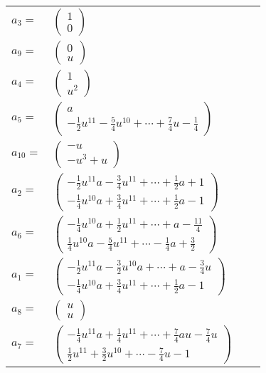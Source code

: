 \documentclass[1p]{elsarticle_modified}
\theoremstyle{definition}
\begin{document}
\begin{tabular}{m{7pt} m{180pt} m{7pt} m{180pt} }
\flushright $a_{3}=$&$\begin{pmatrix}1\\0\end{pmatrix}$ \\
\flushright $a_{9}=$&$\begin{pmatrix}0\\u\end{pmatrix}$ \\
\flushright $a_{4}=$&$\begin{pmatrix}1\\u^2\end{pmatrix}$ \\
\flushright $a_{5}=$&$\begin{pmatrix}a\\-\frac{1}{2} u^{11}-\frac{5}{4} u^{10}+\cdots+\frac{7}{4} u-\frac{1}{4}\end{pmatrix}$ \\
\flushright $a_{10}=$&$\begin{pmatrix}- u\\- u^3+u\end{pmatrix}$ \\
\flushright $a_{2}=$&$\begin{pmatrix}-\frac{1}{2} u^{11} a-\frac{3}{4} u^{11}+\cdots+\frac{1}{2} a+1\\-\frac{1}{4} u^{10} a+\frac{3}{4} u^{11}+\cdots+\frac{1}{2} a-1\end{pmatrix}$ \\
\flushright $a_{6}=$&$\begin{pmatrix}-\frac{1}{4} u^{10} a+\frac{1}{2} u^{11}+\cdots+a-\frac{11}{4}\\\frac{1}{4} u^{10} a-\frac{5}{4} u^{11}+\cdots-\frac{1}{4} a+\frac{3}{2}\end{pmatrix}$ \\
\flushright $a_{1}=$&$\begin{pmatrix}-\frac{1}{2} u^{11} a-\frac{3}{2} u^{10} a+\cdots+a-\frac{3}{4} u\\-\frac{1}{4} u^{10} a+\frac{3}{4} u^{11}+\cdots+\frac{1}{2} a-1\end{pmatrix}$ \\
\flushright $a_{8}=$&$\begin{pmatrix}u\\u\end{pmatrix}$ \\
\flushright $a_{7}=$&$\begin{pmatrix}-\frac{1}{4} u^{11} a+\frac{1}{4} u^{11}+\cdots+\frac{7}{4} a u-\frac{7}{4} u\\\frac{1}{2} u^{11}+\frac{3}{2} u^{10}+\cdots-\frac{7}{4} u-1\end{pmatrix}$ \\

\end{tabular}
\end{document}
